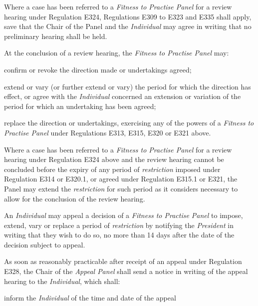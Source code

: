 \par
Where a case has been referred to a \emph{Fitness to Practise Panel} for
a review hearing under Regulation E324, Regulations E309 to E323 and
E335 shall apply, save that the Chair of the Panel and
the \emph{Individual} may agree in writing that no preliminary hearing
shall be held.\\
\hspace*{0.333em}\par
{}\par
At the conclusion of a review hearing, the \emph{Fitness to Practise
Panel} may:\\\nl \item confirm or revoke the direction made or undertakings agreed;\item extend or vary (or further extend or vary) the period for which the
direction has effect, or agree with the \emph{Individual} concerned an
extension or variation of the period for which an undertaking has been
agreed;\item replace the direction or undertakings, exercising any of the powers
of a \emph{Fitness to Practise Panel} under Regulations E313, E315, E320
or E321 above.\ln
{}\par
Where a case has been referred to a \emph{Fitness to Practise Panel} for
a review hearing under Regulation E324 above and the review hearing
cannot be concluded before the expiry of any period
of \emph{restriction} imposed under Regulation E314 or E320.1, or agreed
under Regulation E315.1 or E321, the Panel may extend
the \emph{restriction} for such period as it considers necessary to
allow for the conclusion of the review hearing.\\
\par
{}
An \emph{Individual} may appeal a decision of a \emph{Fitness to
Practise Panel} to impose, extend, vary or replace a period
of \emph{restriction} by notifying the \emph{President} in writing that
they wish to do so, no more than 14 days after the date of the decision
subject to appeal.\\
\par
As soon as reasonably practicable after receipt of an appeal under
Regulation E328, the Chair of the \emph{Appeal Panel} shall send a
notice in writing of the appeal hearing to the \emph{Individual}, which
shall:\\\nl \item inform the \emph{Individual } of the time and date of the appeal
